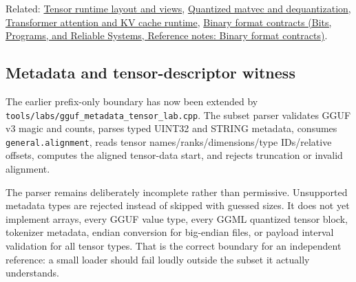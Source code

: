 Related: \hyperref[appendix-cebadf3106d1]{Tensor runtime layout and views}, \hyperref[appendix-241c0e42ac2d]{Quantized matvec and dequantization}, \hyperref[appendix-ea2dadd21ce5]{Transformer attention and KV cache runtime}, \href{../01-Bits-Programs-and-Reliable-Systems/main.pdf\#nameddest=appendix-590bbb2424c1}{Binary format contracts (Bits, Programs, and Reliable Systems, Reference notes: Binary format contracts)}.

\subsection{Metadata and tensor-descriptor witness}\label{appendix-fef72dd246f2-metadata-and-tensor-descriptor-witness}

\hypertarget{appendix-fef72dd246f2-metadata-and-tensor-descriptor-witness}{}

The earlier prefix-only boundary has now been extended by \texttt{tools/labs/gguf\_metadata\_tensor\_lab.cpp}. The subset parser validates GGUF v3 magic and counts, parses typed UINT32 and STRING metadata, consumes \texttt{general.alignment}, reads tensor names/ranks/dimensions/type IDs/relative offsets, computes the aligned tensor-data start, and rejects truncation or invalid alignment.

The parser remains deliberately incomplete rather than permissive. Unsupported metadata types are rejected instead of skipped with guessed sizes. It does not yet implement arrays, every GGUF value type, every GGML quantized tensor block, tokenizer metadata, endian conversion for big-endian files, or payload interval validation for all tensor types. That is the correct boundary for an independent reference: a small loader should fail loudly outside the subset it actually understands.
